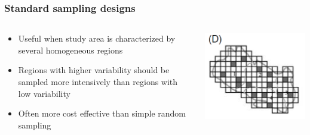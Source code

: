\documentclass[color=usenames,dvipsnames]{beamer}\usepackage[]{graphicx}\usepackage[]{xcolor}
\begin{document}
\begin{frame}
  \frametitle{Standard sampling designs}
  \large
  {\centering \bf \Large \color{RoyalBlue}{Stratified random sampling} \par}
  \vfill
  \begin{columns}
    \large
    \begin{column}{0.6\textwidth}
      \begin{itemize}[<+->]
        \item Useful when study area is characterized by several
          homogeneous regions
        \item Regions with higher variability should be sampled more
          intensively than regions with low variability
        \item Often more cost effective than simple random sampling
      \end{itemize}
    \end{column}
    \begin{column}{0.4\textwidth}
      \includegraphics[width=\textwidth]{figs/designD}
    \end{column}
  \end{columns}
\end{frame}



\end{document}
